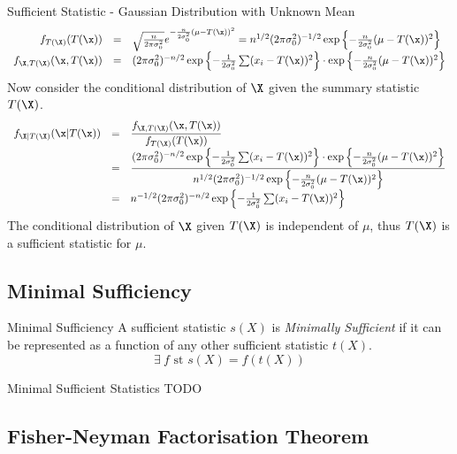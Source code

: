 \documentclass[11pt,a4paper]{article}
\begin{document}
\begin{example}{Sufficient Statistic - Gaussian Distribution with Unknown Mean}
\[\begin{array}{rcl}
      f_{T(\X)}(T(\x))&=&\sqrt{\frac{n}{2\pi\sigma_0^2}}e^{-\frac{n}{2\sigma_0^2}(\mu-T(\x))^2}=n^{1/2}(2\pi\sigma_0^2)^{-1/2}\exp\left\{-\frac{n}{2\sigma_0^2}(\mu-T(\x))^2\right\}\\
      f_{\X,T(\X)}(\x,T(\x))&=&(2\pi\sigma_0^2)^{-n/2}\exp\left\{-\frac1{2\sigma_0^2}\sum(x_i-T(\x))^2\right\}\cdot\exp\left\{-\frac{n}{2\sigma_0^2}(\mu-T(\x))^2\right\}\\
    \end{array}\]
    Now consider the conditional distribution of $\X$ given the summary statistic $T(\X)$.
    \[\begin{array}{rcl}
      f_{\X|T(\X)}(\x|T(\x))&=&\dfrac{f_{\X,T(\X)}(\x,T(\x))}{f_{T(\X)}(T(\x))}\\
      &=&\dfrac{(2\pi\sigma_0^2)^{-n/2}\exp\left\{-\frac1{2\sigma_0^2}\sum(x_i-T(\x))^2\right\}\cdot\exp\left\{-\frac{n}{2\sigma_0^2}(\mu-T(\x))^2\right\}}{n^{1/2}(2\pi\sigma_0^2)^{-1/2}\exp\left\{-\frac{n}{2\sigma_0^2}(\mu-T(\x))^2\right\}}\\
      &=&n^{-1/2}(2\pi\sigma_0^2)^{-n/2}\exp\left\{-\frac1{2\sigma_0^2}\sum(x_i-T(\x))^2\right\}
    \end{array}\]
    The conditional distribution of $\X$ given $T(\X)$ is independent of $\mu$, thus $T(\X)$ is a sufficient statistic for $\mu$.
  \end{example}

\subsection{Minimal Sufficiency}

  \begin{definition}{Minimal Sufficiency}
    A sufficient statistic $s(X)$ is \textit{Minimally Sufficient} if it can be represented as a function of any other sufficient statistic $t(X)$.
    \[ \exists\ f\text{ st }s(X)=f(t(X)) \]
  \end{definition}

  \begin{example}{Minimal Sufficient Statistics}
    TODO
  \end{example}

\subsection{Fisher-Neyman Factorisation Theorem}
\end{document}
